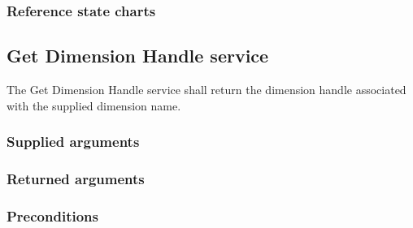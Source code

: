 \begin{compactstdpage}
    \subsubsection{Reference state charts}


    \subsection{Get Dimension Handle service}

    The Get Dimension Handle service shall return the dimension handle associated with the supplied dimension name.

    \subsubsection{Supplied arguments}


    \subsubsection{Returned arguments}


    \subsubsection{Preconditions}

\end{compactstdpage}

\clearpage

